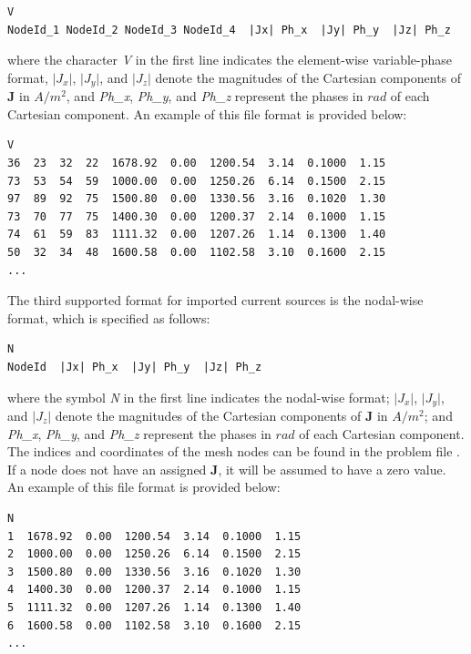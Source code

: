 \begin{small}\begin{lstlisting}
V
NodeId_1 NodeId_2 NodeId_3 NodeId_4  |Jx| Ph_x  |Jy| Ph_y  |Jz| Ph_z
\end{lstlisting}\end{small} 
where the character \textit{V} in the first line indicates the element-wise variable-phase format, $\lvert J_x \rvert$, $\lvert J_y \rvert$, and $\lvert J_z \rvert$ denote the magnitudes of the Cartesian components of $\mathbf{J}$ in $A/m^{2}$, and \textit{Ph\_x}, \textit{Ph\_y}, and \textit{Ph\_z} represent the phases in $rad$ of each Cartesian component. An example of this file format is provided below:
\begin{small}\begin{lstlisting}
V
36  23  32  22  1678.92  0.00  1200.54  3.14  0.1000  1.15
73  53  54  59  1000.00  0.00  1250.26  6.14  0.1500  2.15
97  89  92  75  1500.80  0.00  1330.56  3.16  0.1020  1.30
73  70  77  75  1400.30  0.00  1200.37  2.14  0.1000  1.15
74  61  59  83  1111.32  0.00  1207.26  1.14  0.1300  1.40
50  32  34  48  1600.58  0.00  1102.58  3.10  0.1600  2.15
...
\end{lstlisting}\end{small} 
The third supported format for imported current sources is the nodal-wise format, which is specified as follows: 
\begin{small}\begin{lstlisting}
N
NodeId  |Jx| Ph_x  |Jy| Ph_y  |Jz| Ph_z
\end{lstlisting}\end{small} 
where the symbol \textit{N} in the first line indicates the nodal-wise format; $\lvert J_x \rvert$, $\lvert J_y \rvert$, and $\lvert J_z \rvert$ denote the magnitudes of the Cartesian components of $\mathbf{J}$ in $A/m^{2}$; and \textit{Ph\_x}, \textit{Ph\_y}, and \textit{Ph\_z} represent the phases in $rad$ of each Cartesian component. The indices and coordinates of the mesh nodes can be found in the problem file . If a node does not have an assigned \textbf{J}, it will be assumed to have a zero value. An example of this file format is provided below:
\begin{small}\begin{lstlisting}
N
1  1678.92  0.00  1200.54  3.14  0.1000  1.15
2  1000.00  0.00  1250.26  6.14  0.1500  2.15
3  1500.80  0.00  1330.56  3.16  0.1020  1.30
4  1400.30  0.00  1200.37  2.14  0.1000  1.15
5  1111.32  0.00  1207.26  1.14  0.1300  1.40
6  1600.58  0.00  1102.58  3.10  0.1600  2.15
...
\end{lstlisting}\end{small} 

